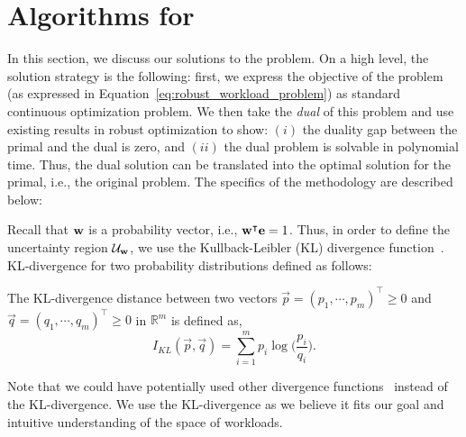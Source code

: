 \section{Algorithms for  {\large {\robustw}}}

In this section, we discuss our solutions to the {\robustw} problem. 
On a high level, the solution strategy is the following:
first, we express the objective of the problem (as expressed in 
    Equation~\eqref{eq:robust_workload_problem}) as standard continuous
    optimization problem.  
We then take the \emph{dual} of this problem and use existing results in robust optimization to show:
    $(i)$ the duality gap between the primal and the dual is zero, and 
    $(ii)$ the dual problem is solvable in polynomial time.
Thus, the dual solution can be translated into the optimal solution for the primal, i.e.,
the original {\robustw} problem.  
The specifics of the methodology are described below: 

  Recall that 
${{\bf{w}}}$ is a probability vector, i.e., 
    ${{\bf{w}}}^\intercal{{\ensuremath{\bf{e}}}} = 1$. Thus, in order to define the uncertainty region 
    $\mathcal{U}_{{\bf{w}}}$, we use the Kullback-Leibler (KL) divergence
    function~\cite{Kullback1951}. KL-divergence for two probability
    distributions defined as follows:
 
\begin{definition}\label{def:KL}   
    The KL-divergence distance between two vectors
    $\vec{p} = (p_1, \cdots, p_m)^\intercal \geq 0$ and
    $\vec{q} = (q_1, \cdots, q_m)^\intercal \geq 0$ in 
    $\mathbb{R}^m$ is defined as,
\begin{equation*}
    I_{KL}(\vec{p}, \vec{q}) = \sum_{i=1}^{m}p_i \log\bigg(\frac{p_i}{q_i}\bigg).
\end{equation*}
\end{definition}
Note that we could have potentially used other divergence
    functions~\cite{Pardo2018-ou} instead of the KL-divergence.
We use the KL-divergence as we believe it fits our goal and intuitive
    understanding of the space of workloads.

